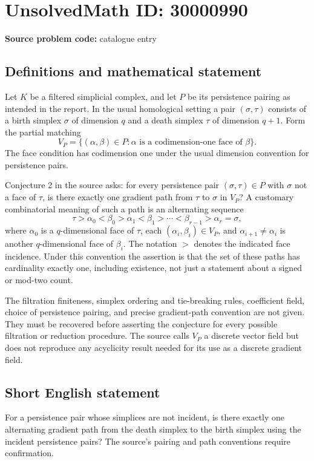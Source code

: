 \documentclass[11pt]{article}
\begin{document}
\section*{UnsolvedMath ID: 30000990}
\textbf{Source problem code:} catalogue entry
\subsection{Definitions and mathematical statement}
Let \(K\) be a filtered simplicial complex, and let \(P\) be its persistence pairing as intended in the report. In the usual homological setting a pair \((\sigma,\tau)\) consists of a birth simplex \(\sigma\) of dimension \(q\) and a death simplex \(\tau\) of dimension \(q+1\). Form the partial matching
\[
V_P=\{(\alpha,\beta)\in P:\alpha\text{ is a codimension-one face of }\beta\}.
\]
The face condition has codimension one under the usual dimension convention for persistence pairs.

Conjecture 2 in the source asks: for every persistence pair \((\sigma,\tau)\in P\) with \(\sigma\) not a face of \(\tau\), is there exactly one gradient path from \(\tau\) to \(\sigma\) in \(V_P\)? A customary combinatorial meaning of such a path is an alternating sequence
\[
\tau>\alpha_0<\beta_0>\alpha_1<\beta_1>\cdots<\beta_{r-1}>\alpha_r=\sigma,
\]
where \(\alpha_0\) is a \(q\)-dimensional face of \(\tau\), each \((\alpha_i,\beta_i)\in V_P\), and \(\alpha_{i+1}\ne\alpha_i\) is another \(q\)-dimensional face of \(\beta_i\). The notation \(>\) denotes the indicated face incidence. Under this convention the assertion is that the set of these paths has cardinality exactly one, including existence, not just a statement about a signed or mod-two count.

The filtration finiteness, simplex ordering and tie-breaking rules, coefficient field, choice of persistence pairing, and precise gradient-path convention are not given. They must be recovered before asserting the conjecture for every possible filtration or reduction procedure. The source calls \(V_P\) a discrete vector field but does not reproduce any acyclicity result needed for its use as a discrete gradient field.
\subsection{Short English statement}
For a persistence pair whose simplices are not incident, is there exactly one alternating gradient path from the death simplex to the birth simplex using the incident persistence pairs? The source’s pairing and path conventions require confirmation.
\end{document}
